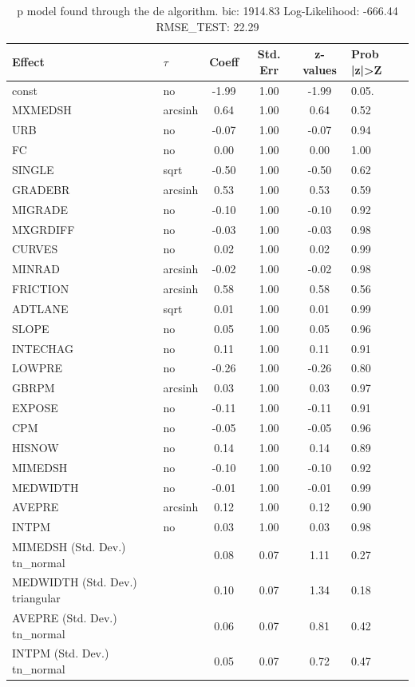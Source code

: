 \begin{table}
	\caption{p model found through the de algorithm. bic: 1914.83 Log-Likelihood: -666.44 RMSE_TEST: 22.29}
	\begin{center}
		\begin{tabular}{|l|l|c|c|c|l|}
			\hline
			Effect & $\tau$ & Coeff & Std. Err & z-values & Prob |z|>Z \\
			\hline
			const & no & -1.99 & 1.00 & -1.99 & 0.05. \\
			\hline
			MXMEDSH & arcsinh & 0.64 & 1.00 & 0.64 & 0.52 \\
			\hline
			URB & no & -0.07 & 1.00 & -0.07 & 0.94 \\
			\hline
			FC & no & 0.00 & 1.00 & 0.00 & 1.00 \\
			\hline
			SINGLE & sqrt & -0.50 & 1.00 & -0.50 & 0.62 \\
			\hline
			GRADEBR & arcsinh & 0.53 & 1.00 & 0.53 & 0.59 \\
			\hline
			MIGRADE & no & -0.10 & 1.00 & -0.10 & 0.92 \\
			\hline
			MXGRDIFF & no & -0.03 & 1.00 & -0.03 & 0.98 \\
			\hline
			CURVES & no & 0.02 & 1.00 & 0.02 & 0.99 \\
			\hline
			MINRAD & arcsinh & -0.02 & 1.00 & -0.02 & 0.98 \\
			\hline
			FRICTION & arcsinh & 0.58 & 1.00 & 0.58 & 0.56 \\
			\hline
			ADTLANE & sqrt & 0.01 & 1.00 & 0.01 & 0.99 \\
			\hline
			SLOPE & no & 0.05 & 1.00 & 0.05 & 0.96 \\
			\hline
			INTECHAG & no & 0.11 & 1.00 & 0.11 & 0.91 \\
			\hline
			LOWPRE & no & -0.26 & 1.00 & -0.26 & 0.80 \\
			\hline
			GBRPM & arcsinh & 0.03 & 1.00 & 0.03 & 0.97 \\
			\hline
			EXPOSE & no & -0.11 & 1.00 & -0.11 & 0.91 \\
			\hline
			CPM & no & -0.05 & 1.00 & -0.05 & 0.96 \\
			\hline
			HISNOW & no & 0.14 & 1.00 & 0.14 & 0.89 \\
			\hline
			MIMEDSH & no & -0.10 & 1.00 & -0.10 & 0.92 \\
			\hline
			MEDWIDTH & no & -0.01 & 1.00 & -0.01 & 0.99 \\
			\hline
			AVEPRE & arcsinh & 0.12 & 1.00 & 0.12 & 0.90 \\
			\hline
			INTPM & no & 0.03 & 1.00 & 0.03 & 0.98 \\
			\hline
			MIMEDSH (Std. Dev.) tn_normal &  & 0.08 & 0.07 & 1.11 & 0.27 \\
			\hline
			MEDWIDTH (Std. Dev.) triangular &  & 0.10 & 0.07 & 1.34 & 0.18 \\
			\hline
			AVEPRE (Std. Dev.) tn_normal &  & 0.06 & 0.07 & 0.81 & 0.42 \\
			\hline
			INTPM (Std. Dev.) tn_normal &  & 0.05 & 0.07 & 0.72 & 0.47 \\
			\hline
		\end{tabular}
	\end{center}
\end{table}